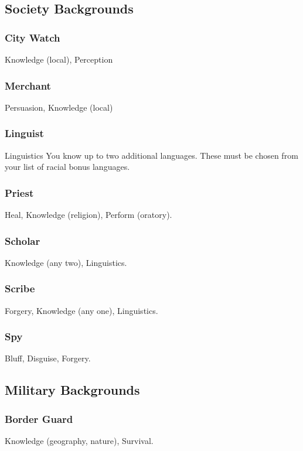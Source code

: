 \subsection{Society Backgrounds}

\subsubsection{City Watch}
 Knowledge (local), Perception

\subsubsection{Merchant}
 Persuasion, Knowledge (local)

\subsubsection{Linguist}
 Linguistics
 You know up to two additional languages. These must be chosen from your list of racial bonus languages.

\subsubsection{Priest}
 Heal, Knowledge (religion), Perform (oratory).

\subsubsection{Scholar}
 Knowledge (any two), Linguistics.

\subsubsection{Scribe}
 Forgery, Knowledge (any one), Linguistics.

\subsubsection{Spy}
 Bluff, Disguise, Forgery.

\subsection{Military Backgrounds}

\subsubsection{Border Guard}
 Knowledge (geography, nature), Survival.

